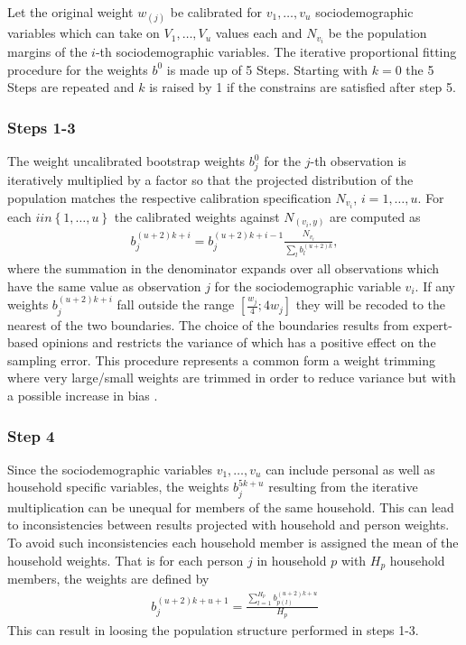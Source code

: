 \documentclass{scrartcl}
\begin{document}
Let the original weight $w_(j)$ be calibrated for $v_1,\ldots,v_u$ sociodemographic variables which can take on $V_1,\ldots,V_u$ values each and $N_{v_i}$ be the population margins of the $i$-th sociodemographic variables. The iterative proportional fitting procedure for the weights $b^{0}$ is made up of 5 Steps. Starting with $k=0$ the 5 Steps are repeated and $k$ is raised by 1 if the constrains are satisfied after step 5.

\subsubsection{Steps 1-3}
The weight uncalibrated bootstrap weights $b_j^{0}$ for the $j$-th observation is iteratively multiplied by a factor so that the projected distribution of the population matches the respective calibration specification $N_{v_i}$, $i=1,\ldots,u$.
For each $i in \left\{1,\ldots,u\right\}$ the calibrated weights against $N_({v_i,y})$ are computed as
\begin{align*}
  b_j^{(u+2)k+i} = b_j^{(u+2)k+i-1}\frac{N_{v_i}}{\sum\limits_l b_l^{(u+2)k}},
\end{align*}
where the summation in the denominator expands over all observations which have the same value as observation $j$ for the sociodemographic variable $v_i$.
If any weights $b_j^{(u+2)k+i}$ fall outside the range $[\frac{w_j}{4};4w_j]$ they will be recoded to the nearest of the two boundaries. The choice of the boundaries results from expert-based opinions and restricts the variance of which has a positive effect on the sampling error. This procedure represents a common form a weight trimming where very large/small weights are trimmed in order to reduce variance but with a possible increase in bias \citep{potter90,potter93}.

\subsubsection{Step 4}
Since the sociodemographic variables $v_1,\ldots,v_u$ can include personal as well as household specific variables, the weights $b_j^{5k+u}$   resulting from the iterative multiplication can be unequal for members of the same household. This can lead to inconsistencies between results projected with household and person weights. To avoid such inconsistencies each household member is assigned the mean of the household weights. That is for each person $j$ in household $p$ with $H_p$ household members, the weights are defined by
\begin{align*}
  b_j^{(u+2)k+u+1} = \frac{\sum\limits_{l=1}^{H_p}b_{p(l)}^{(u+2)k+u}}{H_p}
\end{align*}
This can result in loosing the population structure performed in steps 1-3.
\end{document}
